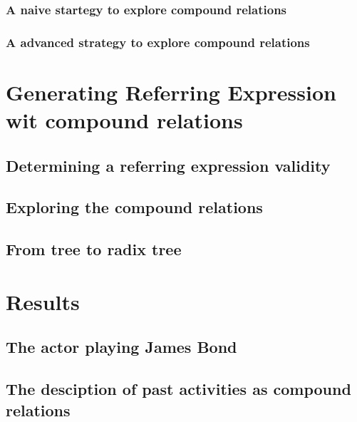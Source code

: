 \subsubsection{A naive startegy to explore compound relations}

\subsubsection{A advanced strategy to explore compound relations}


\section{Generating Referring Expression wit compound relations}

\subsection{Determining a referring expression validity}

\subsection{Exploring the compound relations}

\subsection{From tree to radix tree}


\section{Results}

\subsection{The actor playing James Bond}

\subsection{The desciption of past activities as compound relations}